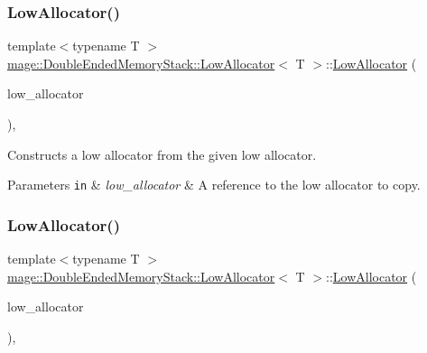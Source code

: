 \subsubsection{\texorpdfstring{Low\+Allocator()}{LowAllocator()}\hspace{0.1cm}{\footnotesize\ttfamily [1/4]}}
{\footnotesize\ttfamily template$<$typename T $>$ \\
\mbox{\hyperlink{classmage_1_1_double_ended_memory_stack_1_1_low_allocator}{mage\+::\+Double\+Ended\+Memory\+Stack\+::\+Low\+Allocator}}$<$ T $>$\+::\mbox{\hyperlink{classmage_1_1_double_ended_memory_stack_1_1_low_allocator}{Low\+Allocator}} (\begin{DoxyParamCaption}\item[{const \mbox{\hyperlink{classmage_1_1_double_ended_memory_stack_1_1_low_allocator}{Low\+Allocator}}$<$ T $>$ \&}]{low\+\_\+allocator }\end{DoxyParamCaption})\hspace{0.3cm}{\ttfamily [default]}, {\ttfamily [noexcept]}}

Constructs a low allocator from the given low allocator.


\begin{DoxyParams}[1]{Parameters}
\mbox{\tt in}  & {\em low\+\_\+allocator} & A reference to the low allocator to copy. \\
\hline
\end{DoxyParams}
\mbox{\label{classmage_1_1_double_ended_memory_stack_1_1_low_allocator_aa60a12ecd37a8b586c718de9cb0e21b0}} 
\subsubsection{\texorpdfstring{Low\+Allocator()}{LowAllocator()}\hspace{0.1cm}{\footnotesize\ttfamily [2/4]}}
{\footnotesize\ttfamily template$<$typename T $>$ \\
\mbox{\hyperlink{classmage_1_1_double_ended_memory_stack_1_1_low_allocator}{mage\+::\+Double\+Ended\+Memory\+Stack\+::\+Low\+Allocator}}$<$ T $>$\+::\mbox{\hyperlink{classmage_1_1_double_ended_memory_stack_1_1_low_allocator}{Low\+Allocator}} (\begin{DoxyParamCaption}\item[{\mbox{\hyperlink{classmage_1_1_double_ended_memory_stack_1_1_low_allocator}{Low\+Allocator}}$<$ T $>$ \&\&}]{low\+\_\+allocator }\end{DoxyParamCaption})\hspace{0.3cm}{\ttfamily [default]}, {\ttfamily [noexcept]}}

